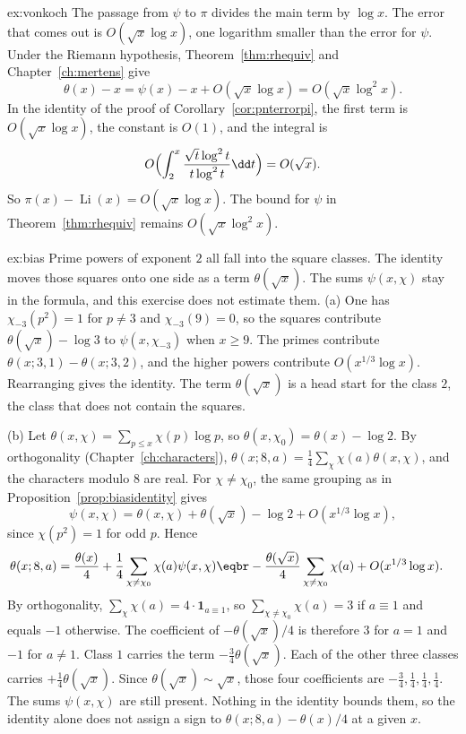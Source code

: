 \begin{solution}{ex:vonkoch}
\idea The passage from $\psi$ to $\pi$ divides the main term by $\log x$. The error that comes out is $O(\sqrt x\log x)$, one logarithm smaller than the error for $\psi$.
\writeup Under the Riemann hypothesis, Theorem~\ref{thm:rhequiv} and Chapter~\ref{ch:mertens} give
\[
\theta(x)-x=\psi(x)-x+O(\sqrt x\log x)=O(\sqrt x\log^2x).
\]
In the identity of the proof of Corollary~\ref{cor:pnterrorpi}, the first term is $O(\sqrt x\log x)$, the constant is $O(1)$, and the integral is
\[
O\Bigl(\int_2^x\frac{\sqrt t\log^2t}{t\log^2t}\dd t\Bigr)=O(\sqrt x).
\]
So $\pi(x)-\operatorname{Li}(x)=O(\sqrt x\log x)$. The bound for $\psi$ in Theorem~\ref{thm:rhequiv} remains $O(\sqrt x\log^2x)$.
\end{solution}

\begin{solution}{ex:bias}
\idea Prime powers of exponent $2$ all fall into the square classes. The identity moves those squares onto one side as a term $\theta(\sqrt x)$. The sums $\psi(x,\chi)$ stay in the formula, and this exercise does not estimate them.
\writeup (a) One has $\chi_{-3}(p^2)=1$ for $p\ne3$ and $\chi_{-3}(9)=0$, so the squares contribute $\theta(\sqrt x)-\log3$ to $\psi(x,\chi_{-3})$ when $x\ge9$. The primes contribute $\theta(x;3,1)-\theta(x;3,2)$, and the higher powers contribute $O(x^{1/3}\log x)$. Rearranging gives the identity. The term $\theta(\sqrt x)$ is a head start for the class $2$, the class that does not contain the squares.

(b) Let $\theta(x,\chi)=\sum_{p\le x}\chi(p)\log p$, so $\theta(x,\chi_0)=\theta(x)-\log2$. By orthogonality (Chapter~\ref{ch:characters}), $\theta(x;8,a)=\frac14\sum_\chi\chi(a)\theta(x,\chi)$, and the characters modulo $8$ are real. For $\chi\ne\chi_0$, the same grouping as in Proposition~\ref{prop:biasidentity} gives
\[
\psi(x,\chi)=\theta(x,\chi)+\theta(\sqrt x)-\log2+O(x^{1/3}\log x),
\]
since $\chi(p^2)=1$ for odd $p$. Hence
\[
\begin{aligned}\theta(x;8,a)&=\frac{\theta(x)}4+\frac14\sum_{\chi\ne\chi_0}\chi(a)\psi(x,\chi)\eqbr-\frac{\theta(\sqrt x)}4\sum_{\chi\ne\chi_0}\chi(a)+O(x^{1/3}\log x).\end{aligned}
\]
By orthogonality, $\sum_\chi\chi(a)=4\cdot\mathbf1_{a\equiv1}$, so $\sum_{\chi\ne\chi_0}\chi(a)=3$ if $a\equiv1$ and equals $-1$ otherwise. The coefficient of $-\theta(\sqrt x)/4$ is therefore $3$ for $a=1$ and $-1$ for $a\ne1$. Class $1$ carries the term $-\frac34\theta(\sqrt x)$. Each of the other three classes carries $+\frac14\theta(\sqrt x)$. Since $\theta(\sqrt x)\sim\sqrt x$, those four coefficients are $-\frac34,\frac14,\frac14,\frac14$. The sums $\psi(x,\chi)$ are still present. Nothing in the identity bounds them, so the identity alone does not assign a sign to $\theta(x;8,a)-\theta(x)/4$ at a given $x$.


\end{solution}
